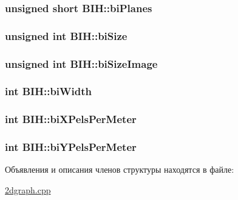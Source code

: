 \hypertarget{struct_b_i_h_aaa13a4d8e94f79eb8aba17dd36fbcc2c}{
\subsubsection[{bi\+Planes}]{\setlength{\rightskip}{0pt plus 5cm}unsigned short B\+I\+H\+::bi\+Planes}}\label{struct_b_i_h_aaa13a4d8e94f79eb8aba17dd36fbcc2c}
\hypertarget{struct_b_i_h_a07c713ee07612e15f4fdca57077a8319}{
\subsubsection[{bi\+Size}]{\setlength{\rightskip}{0pt plus 5cm}unsigned int B\+I\+H\+::bi\+Size}}\label{struct_b_i_h_a07c713ee07612e15f4fdca57077a8319}
\hypertarget{struct_b_i_h_aa9e22a9c8fb71af7b24c9aa29dba1a96}{
\subsubsection[{bi\+Size\+Image}]{\setlength{\rightskip}{0pt plus 5cm}unsigned int B\+I\+H\+::bi\+Size\+Image}}\label{struct_b_i_h_aa9e22a9c8fb71af7b24c9aa29dba1a96}
\hypertarget{struct_b_i_h_ad3ee37b4e7c1dd70c0b78deb59a0dbc6}{
\subsubsection[{bi\+Width}]{\setlength{\rightskip}{0pt plus 5cm}int B\+I\+H\+::bi\+Width}}\label{struct_b_i_h_ad3ee37b4e7c1dd70c0b78deb59a0dbc6}
\hypertarget{struct_b_i_h_a95644503bfbc7afda898219a4827e957}{
\subsubsection[{bi\+X\+Pels\+Per\+Meter}]{\setlength{\rightskip}{0pt plus 5cm}int B\+I\+H\+::bi\+X\+Pels\+Per\+Meter}}\label{struct_b_i_h_a95644503bfbc7afda898219a4827e957}
\hypertarget{struct_b_i_h_a89add68a883654afa28ebe985493e355}{
\subsubsection[{bi\+Y\+Pels\+Per\+Meter}]{\setlength{\rightskip}{0pt plus 5cm}int B\+I\+H\+::bi\+Y\+Pels\+Per\+Meter}}\label{struct_b_i_h_a89add68a883654afa28ebe985493e355}


Объявления и описания членов структуры находятся в файле\+:\begin{DoxyCompactItemize}
\item 
\hyperlink{2dgraph_8cpp}{2dgraph.\+cpp}\end{DoxyCompactItemize}
